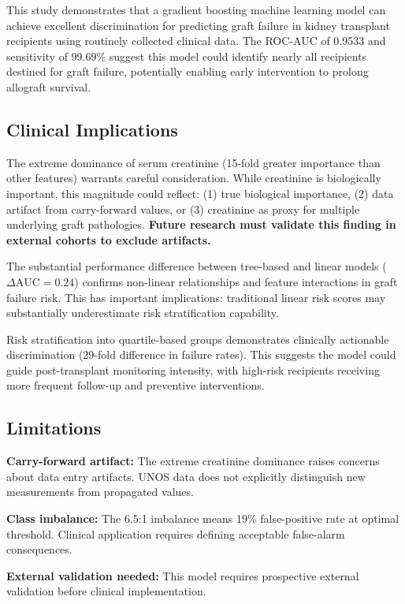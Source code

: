 \documentclass[11pt,a4paper]{article}
\begin{document}
This study demonstrates that a gradient boosting machine learning model can achieve excellent discrimination for predicting graft failure in kidney transplant recipients using routinely collected clinical data. The ROC-AUC of 0.9533 and sensitivity of 99.69\% suggest this model could identify nearly all recipients destined for graft failure, potentially enabling early intervention to prolong allograft survival.

\subsection{Clinical Implications}

The extreme dominance of serum creatinine (15-fold greater importance than other features) warrants careful consideration. While creatinine is biologically important, this magnitude could reflect: (1) true biological importance, (2) data artifact from carry-forward values, or (3) creatinine as proxy for multiple underlying graft pathologies. \textbf{Future research must validate this finding in external cohorts to exclude artifacts.}

The substantial performance difference between tree-based and linear models ($\Delta\text{AUC}=0.24$) confirms non-linear relationships and feature interactions in graft failure risk. This has important implications: traditional linear risk scores may substantially underestimate risk stratification capability.

Risk stratification into quartile-based groups demonstrates clinically actionable discrimination (29-fold difference in failure rates). This suggests the model could guide post-transplant monitoring intensity, with high-risk recipients receiving more frequent follow-up and preventive interventions.

\subsection{Limitations}

\textbf{Carry-forward artifact:} The extreme creatinine dominance raises concerns about data entry artifacts. UNOS data does not explicitly distinguish new measurements from propagated values.

\textbf{Class imbalance:} The 6.5:1 imbalance means 19\% false-positive rate at optimal threshold. Clinical application requires defining acceptable false-alarm consequences.

\textbf{External validation needed:} This model requires prospective external validation before clinical implementation.
\end{document}

